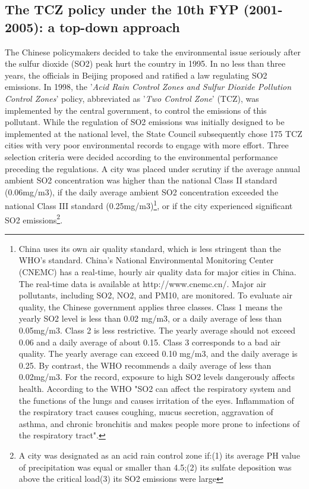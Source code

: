 \documentclass[12pt]{article}
\begin{document}
\subsection{The TCZ policy under the 10th FYP (2001-2005): a top-down approach}

The Chinese policymakers decided to take the environmental issue seriously after the sulfur dioxide (SO2) peak hurt the country in 1995. In no less than three years, the officials in Beijing proposed and ratified a law regulating SO2 emissions. In 1998, the '\textit{Acid Rain Control Zones and Sulfur Dioxide Pollution Control Zones}' policy, abbreviated as '\textit{Two Control Zone}' (TCZ), was implemented by the central government, to control the emissions of this pollutant. While the regulation of SO2 emissions was initially designed to be implemented at the national level, the State Council subsequently chose 175 TCZ cities with very poor environmental records to engage with more effort. Three selection criteria were decided according to the environmental performance preceding the regulations. A city was placed under scrutiny if the average annual ambient SO2 concentration was higher than the national Class II standard (0.06mg/m3), if the daily average ambient SO2 concentration exceeded the national Class III standard (0.25mg/m3)\footnote{ China uses its own air quality standard, which is less stringent than the WHO's standard. China's National Environmental Monitoring Center (CNEMC) has a real-time, hourly air quality data for major cities in China. The real-time data is available at http://www.cnemc.cn/. Major air pollutants, including SO2, NO2, and PM10, are monitored. To evaluate air quality, the Chinese government applies three classes. Class 1 means the yearly SO2 level is less than 0.02 mg/m3, or a daily average of less than 0.05mg/m3. Class 2 is less restrictive. The yearly average should not exceed 0.06 and a daily average of about 0.15. Class 3 corresponds to a bad air quality. The yearly average can exceed 0.10 mg/m3, and the daily average is 0.25. By contrast, the WHO recommends a daily average of less than 0.02mg/m3. For the record, exposure to high SO2 levels dangerously affects health. According to the WHO "SO2 can affect the respiratory system and the functions of the lungs and causes irritation of the eyes. Inflammation of the respiratory tract causes coughing, mucus secretion, aggravation of asthma, and chronic bronchitis and makes people more prone to infections of the respiratory tract".}, or if the city experienced significant SO2 emissions\footnote{ A city was designated as an acid rain control zone if:(1) its average PH value of precipitation was equal or smaller than 4.5;(2) its sulfate deposition was above the critical load(3) its SO2 emissions were large }. 
\end{document}
